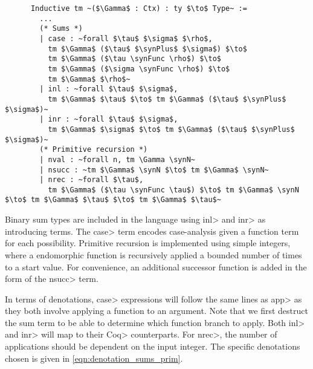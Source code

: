   \begin{listing}
    \begin{verbatim}
      Inductive tm ~($\Gamma$ : Ctx) : ty $\to$ Type~ :=
        ...
        (* Sums *)
        | case : ~forall $\tau$ $\sigma$ $\rho$,
          tm $\Gamma$ ($\tau$ $\synPlus$ $\sigma$) $\to$
          tm $\Gamma$ ($\tau \synFunc \rho$) $\to$
          tm $\Gamma$ ($\sigma \synFunc \rho$) $\to$
          tm $\Gamma$ $\rho$~
        | inl : ~forall $\tau$ $\sigma$,
          tm $\Gamma$ $\tau$ $\to$ tm $\Gamma$ ($\tau$ $\synPlus$ $\sigma$)~
        | inr : ~forall $\tau$ $\sigma$,
          tm $\Gamma$ $\sigma$ $\to$ tm $\Gamma$ ($\tau$ $\synPlus$ $\sigma$)~
        (* Primitive recursion *)
        | nval : ~forall n, tm \Gamma \synN~
        | nsucc : ~tm $\Gamma$ \synN $\to$ tm $\Gamma$ \synN~
        | nrec : ~forall $\tau$,
          tm $\Gamma$ ($\tau \synFunc \tau$) $\to$ tm $\Gamma$ \synN $\to$ tm $\Gamma$ $\tau$ $\to$ tm $\Gamma$ $\tau$~
    \end{verbatim}
    \caption{Terms in our language related to sum types.}
    \label{lst:stlc_sums}
  \end{listing}

  Binary sum types are included in the language using \<inl> and \<inr> as introducing terms.
  The \<case> term encodes case-analysis given a function term for each possibility.
  Primitive recursion is implemented using simple integers, where a endomorphic function is recursively applied a bounded number of times to a start value.
  For convenience, an additional successor function is added in the form of the \<nsucc> term.

  In terms of denotations, \<case> expressions will follow the same lines as \<app> as they both involve applying a function to an argument.
  Note that we first destruct the sum term to be able to determine which function branch to apply.
  Both \<inl> and \<inr> will map to their \<Coq> counterparts.
  For \<nrec>, the number of applications should be dependent on the input integer.
  The specific denotations chosen is given in \cref{eqn:denotation_sums_prim}.

